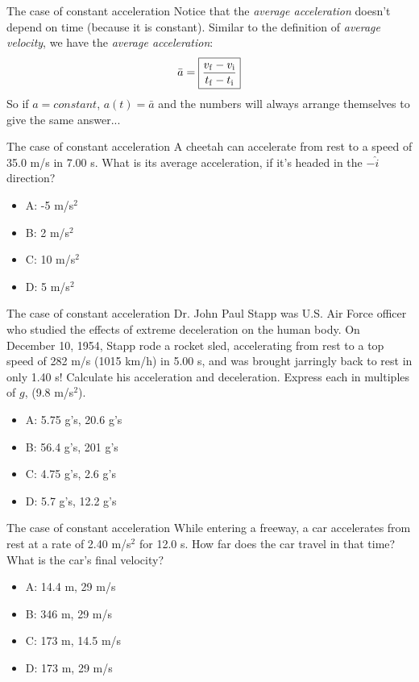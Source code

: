 \documentclass{beamer}
\begin{document}
\begin{frame}{The case of constant acceleration}
Notice that the \textit{average acceleration} doesn't depend on time (because it is constant).  Similar to the definition of \textit{average velocity}, we have the \textit{average acceleration}:\\
\begin{equation}
\bar{a} = \boxed{\frac{v_{\rm f} - v_{\rm i}}{t_{\rm f} - t_{\rm i}}}
\end{equation}
So if $a = constant$, $a(t) = \bar{a}$ and the numbers will always arrange themselves to give the same answer...
\end{frame}

\begin{frame}{The case of constant acceleration}
A cheetah can accelerate from rest to a speed of 35.0 m/s in 7.00 s. What is its average acceleration, if it's headed in the $-\hat{i}$ direction?
\begin{itemize}
\item A: -5 m/s$^2$
\item B: 2 m/s$^2$
\item C: 10 m/s$^2$
\item D: 5 m/s$^2$
\end{itemize}
\end{frame}

\begin{frame}{The case of constant acceleration}
Dr. John Paul Stapp was U.S. Air Force officer who studied the effects of extreme deceleration on the human body.  On December 10, 1954, Stapp rode a rocket sled, accelerating from rest to a top speed of 282 m/s (1015 km/h) in 5.00 s, and was brought jarringly back to rest in only 1.40 s!  Calculate his acceleration and deceleration. Express each in multiples of $g$, (9.8 m/s$^2$).
\begin{itemize}
\item A: 5.75 g's, 20.6 g's
\item B: 56.4 g's, 201 g's
\item C: 4.75 g's, 2.6 g's
\item D: 5.7 g's, 12.2 g's
\end{itemize}
\end{frame}

\begin{frame}{The case of constant acceleration}
While entering a freeway, a car accelerates from rest at a rate of 2.40 m/s$^2$ for 12.0 s.  How far does the car travel in that time?  What is the car’s final velocity?
\begin{itemize}
\item A: 14.4 m, 29 m/s
\item B: 346 m, 29 m/s
\item C: 173 m, 14.5 m/s
\item D: 173 m, 29 m/s
\end{itemize}
\end{frame}
\end{document}
